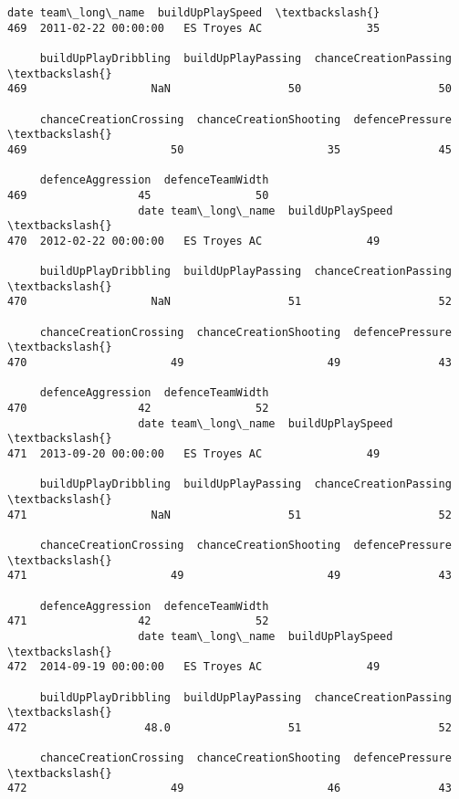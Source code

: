 \documentclass[11pt]{article}
\begin{document}
    \begin{Verbatim}[commandchars=\\\{\}]
                    date team\_long\_name  buildUpPlaySpeed  \textbackslash{}
469  2011-02-22 00:00:00   ES Troyes AC                35   

     buildUpPlayDribbling  buildUpPlayPassing  chanceCreationPassing  \textbackslash{}
469                   NaN                  50                     50   

     chanceCreationCrossing  chanceCreationShooting  defencePressure  \textbackslash{}
469                      50                      35               45   

     defenceAggression  defenceTeamWidth  
469                 45                50  
                    date team\_long\_name  buildUpPlaySpeed  \textbackslash{}
470  2012-02-22 00:00:00   ES Troyes AC                49   

     buildUpPlayDribbling  buildUpPlayPassing  chanceCreationPassing  \textbackslash{}
470                   NaN                  51                     52   

     chanceCreationCrossing  chanceCreationShooting  defencePressure  \textbackslash{}
470                      49                      49               43   

     defenceAggression  defenceTeamWidth  
470                 42                52  
                    date team\_long\_name  buildUpPlaySpeed  \textbackslash{}
471  2013-09-20 00:00:00   ES Troyes AC                49   

     buildUpPlayDribbling  buildUpPlayPassing  chanceCreationPassing  \textbackslash{}
471                   NaN                  51                     52   

     chanceCreationCrossing  chanceCreationShooting  defencePressure  \textbackslash{}
471                      49                      49               43   

     defenceAggression  defenceTeamWidth  
471                 42                52  
                    date team\_long\_name  buildUpPlaySpeed  \textbackslash{}
472  2014-09-19 00:00:00   ES Troyes AC                49   

     buildUpPlayDribbling  buildUpPlayPassing  chanceCreationPassing  \textbackslash{}
472                  48.0                  51                     52   

     chanceCreationCrossing  chanceCreationShooting  defencePressure  \textbackslash{}
472                      49                      46               43   


\end{Verbatim}
\end{document}
